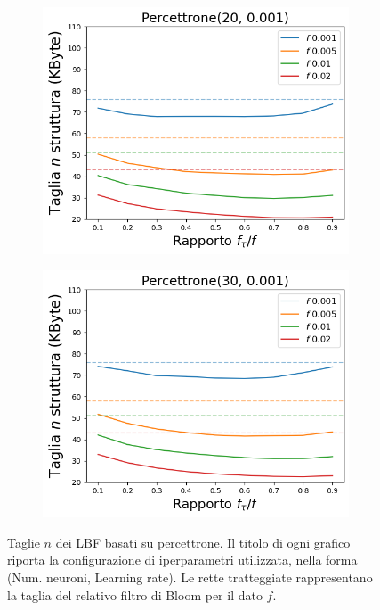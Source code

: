 \documentclass[../../main.tex]{subfiles}
\begin{document}
    \begin{figure}[H]
        \centering
        \begin{subfigure}[b]{0.49\textwidth}
            \centering
            \includegraphics[width = \textwidth]{immagini/7/LBF/Percettrone(20, 0.001)_Taglia.png}
            \caption{}
            \label{fig:LBFTagliaPercettrone20}
        \end{subfigure}
        \begin{subfigure}[b]{0.49\textwidth}
            \centering
            \includegraphics[width = \textwidth]{immagini/7/LBF/Percettrone(30, 0.001)_Taglia.png}
            \caption{}
            \label{fig:LBFTagliaPercettrone30}
        \end{subfigure}
        \caption{Taglie $n$ dei LBF basati su percettrone. Il titolo di ogni grafico riporta la configurazione di iperparametri utilizzata, nella forma (Num. neuroni, Learning rate). Le rette tratteggiate rappresentano la taglia del relativo filtro di Bloom per il dato $f$.}
        \label{fig:tagliePercettroniLBF}
    \end{figure}
\end{document}
